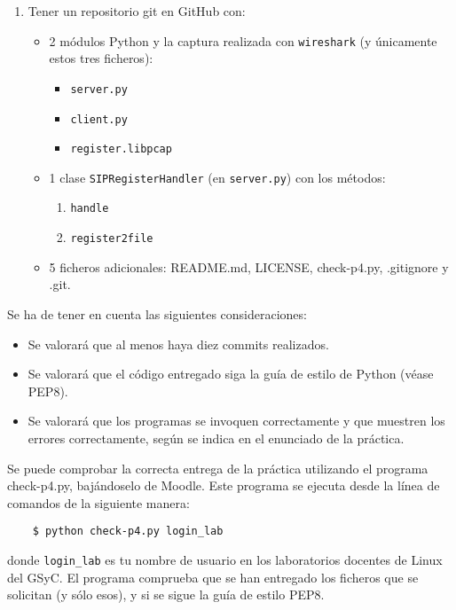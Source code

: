 \documentclass[11pt,a4paper]{article}
\begin{document}
\begin{enumerate}
  \item Tener un repositorio git en GitHub con:
  \begin{itemize}
    \item 2 módulos Python y la captura realizada con \texttt{wireshark} (y únicamente estos tres ficheros):
    \begin{itemize}
      \item \texttt{server.py}
      \item \texttt{client.py}
      \item \texttt{register.libpcap}
    \end{itemize}
    \item 1 clase \texttt{SIPRegisterHandler} (en \texttt{server.py}) con los métodos:
    \begin{enumerate}
      \item \texttt{handle}
      \item \texttt{register2file}
    \end{enumerate}
    \item 5 ficheros adicionales: README.md, LICENSE, check-p4.py, .gitignore y .git.
  \end{itemize}
\end{enumerate}

Se ha de tener en cuenta las siguientes consideraciones:
\begin{itemize}
  \item Se valorará que al menos haya diez commits realizados.
  \item Se valorará que el código entregado siga la guía de estilo de Python (véase PEP8).
  \item Se valorará que los programas se invoquen correctamente y que muestren los errores correctamente, según se indica en el enunciado de la práctica.
\end{itemize}

Se puede comprobar la correcta entrega de la práctica utilizando el programa check-p4.py, bajándoselo de Moodle. Este programa se ejecuta desde la línea de comandos de la siguiente manera:
\begin{verbatim}
	$ python check-p4.py login_lab
\end{verbatim}


donde \texttt{login\_lab} es tu nombre de usuario en los laboratorios docentes de Linux del GSyC. El programa comprueba que se han entregado los ficheros que se solicitan (y sólo esos), y si se sigue la guía de estilo PEP8.
\end{document}
